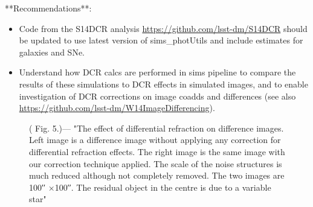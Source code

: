 \documentclass[]{article}
\begin{document}
**Recommendations**:
\begin{itemize}
	\item Code from the S14DCR analysis
          \url{https://github.com/lsst-dm/S14DCR} should be updated to
          use latest version of sims\_photUtils and include estimates
          for galaxies and SNe.
	\item Understand how DCR calcs are performed in sims pipeline
          to compare the results of these simulations to DCR effects
          in simulated images, and to enable investigation of DCR
          corrections on image coadds and differences (see also
          \url{https://github.com/lsst-dm/W14ImageDifferencing}).
\end{itemize}


\begin{figure}[t!]
	\begin{center}
		\caption{(\citeauthor{AlcockDiffIm1999} Fig. 5.)— "The effect of differential refraction on difference images. Left image is a difference image without applying any correction for differential refraction effects. The right image is the same image with our correction technique applied. The scale of the noise structures is much reduced although not completely removed. The two images are 100′′ ×100′′. The residual object in the centre is due to a variable star"}
		\label{Fig:Alcock5}
	\end{center}
\end{figure}
\end{document}
